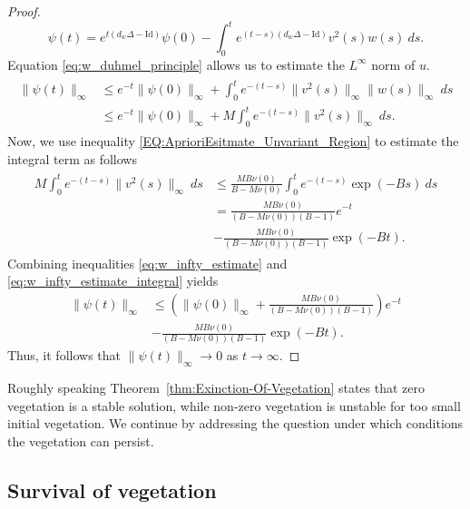 \documentclass[preprint,12pt]{elsarticle}
\theoremstyle{plain}
\theoremstyle{definition}
\theoremstyle{remark}
\begin{document}
\begin{proof}
\begin{equation}
        \psi(t) = e^{t(d_w\Delta - \mathrm{Id})} \psi(0) - \int_0^t e^{(t-s)(d_w\Delta - \mathrm{Id})} v^2(s) w(s)\:ds.
    \end{equation}
    Equation \eqref{eq:w_duhmel_principle} allows us to estimate the $L^\infty$ norm of $u$.
    \begin{align}
        \label{eq:w_infty_estimate}
        \begin{split}
            \|\psi(t)\|_\infty 
            &\leq e^{-t}\|\psi(0)\|_\infty + \int_0^t e^{-(t-s)} \|v^2(s)\|_\infty \|w(s)\|_\infty\:ds \\
            &\leq e^{-t}\|\psi(0)\|_\infty + M \int_0^t e^{-(t-s)} \|v^2(s)\|_\infty \:ds.
        \end{split}
    \end{align}
    Now, we use inequality \eqref{EQ:AprioriEsitmate_Unvariant_Region} to estimate the integral term as follows
    \begin{align}
        \label{eq:w_infty_estimate_integral}
        \begin{split}
            M \int_0^t e^{-(t-s)} \|v^2(s)\|_\infty \:ds 
            &\leq
            \frac{M B \nu(0)}{B-M \nu(0)} \int_0^t e^{-(t-s)} \exp(-Bs)\:ds \\
            &= 
            \frac{M B \nu(0)}{(B-M \nu(0))(B-1)} e^{-t} 
            \\[6pt]
            &- 
            \frac{M B \nu(0)}{(B - M \nu(0))(B-1)} \exp(-Bt).
        \end{split}
    \end{align}
    Combining inequalities \eqref{eq:w_infty_estimate} and \eqref{eq:w_infty_estimate_integral} yields
    \begin{align*}
        \|\psi(t)\|_\infty 
        &\leq \left( \|\psi(0)\|_\infty + \frac{M B \nu(0)}{(B-M\nu(0))(B-1)} \right) e^{-t} \\
        &- \frac{M B \nu(0)}{(B-M\nu(0))(B-1)} \exp(-Bt).
    \end{align*}
    Thus, it follows that $\|\psi(t)\|_\infty \rightarrow 0$ as $t \rightarrow \infty$.
\end{proof}

Roughly speaking Theorem~\ref{thm:Exinction-Of-Vegetation} states that zero vegetation is a stable solution, while non-zero vegetation is unstable for too small initial vegetation. We continue by addressing the question under which conditions the vegetation can persist. 

\subsection{Survival of vegetation}
\end{document}
